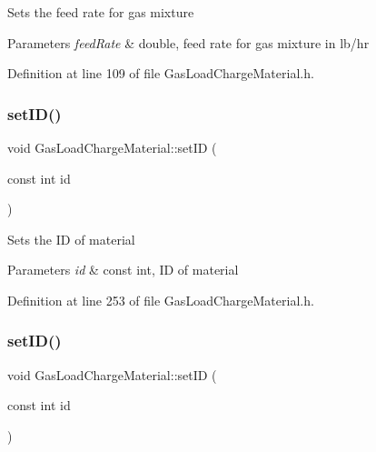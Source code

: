 Sets the feed rate for gas mixture 
\begin{DoxyParams}{Parameters}
{\em feed\+Rate} & double, feed rate for gas mixture in lb/hr \\
\hline
\end{DoxyParams}


Definition at line 109 of file Gas\+Load\+Charge\+Material.\+h.

\mbox{\label{class_gas_load_charge_material_a12d67d6f764318ab09ca340884e717f9}} 
\subsubsection{\texorpdfstring{set\+I\+D()}{setID()}\hspace{0.1cm}{\footnotesize\ttfamily [1/3]}}
{\footnotesize\ttfamily void Gas\+Load\+Charge\+Material\+::set\+ID (\begin{DoxyParamCaption}\item[{const int}]{id }\end{DoxyParamCaption})\hspace{0.3cm}{\ttfamily [inline]}}

Sets the ID of material 
\begin{DoxyParams}{Parameters}
{\em id} & const int, ID of material \\
\hline
\end{DoxyParams}


Definition at line 253 of file Gas\+Load\+Charge\+Material.\+h.

\mbox{\label{class_gas_load_charge_material_a12d67d6f764318ab09ca340884e717f9}} 
\subsubsection{\texorpdfstring{set\+I\+D()}{setID()}\hspace{0.1cm}{\footnotesize\ttfamily [2/3]}}
{\footnotesize\ttfamily void Gas\+Load\+Charge\+Material\+::set\+ID (\begin{DoxyParamCaption}\item[{const int}]{id }\end{DoxyParamCaption})\hspace{0.3cm}{\ttfamily [inline]}}

